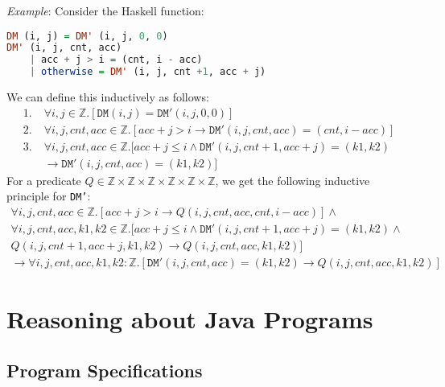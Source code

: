 \documentclass[10pt,twoside,twocolumn]{article}
\begin{document}
\emph{Example}: Consider the Haskell function:
\begin{lstlisting}[language=Haskell,basicstyle={\small\ttfamily},tabsize=4]
DM (i, j) = DM' (i, j, 0, 0)
DM' (i, j, cnt, acc)
	| acc + j > i = (cnt, i - acc)
	| otherwise = DM' (i, j, cnt +1, acc + j)
\end{lstlisting}
We can define this inductively as follows:
\begin{align*}
1.\; & \forall i,j\in\mathbb{Z}.\left[\mathtt{DM}\left(i,j\right)=\mathtt{DM'}\left(i,j,0,0\right)\right]\\
2.\; & \forall i,j,cnt,acc\in\mathbb{Z}.\left[acc+j>i\rightarrow\mathtt{DM'}\left(i,j,cnt,acc\right)=\left(cnt,i-acc\right)\right]\\
3.\; & \forall i,j,cnt,acc\in\mathbb{Z}.[acc+j\leq i\land\mathtt{DM'}\left(i,j,cnt+1,acc+j\right)=\left(k1,k2\right)\\
 & \rightarrow\mathtt{DM'}\left(i,j,cnt,acc\right)=\left(k1,k2\right)]
\end{align*}
For a predicate $Q\in\mathbb{Z}\times\mathbb{Z}\times\mathbb{Z}\times\mathbb{Z}\times\mathbb{Z}\times\mathbb{Z}$,
we get the following inductive principle for \texttt{DM'}:
\begin{multline*}
\forall i,j,cnt,acc\in\mathbb{Z}.\left[acc+j>i\rightarrow Q\left(i,j,cnt,acc,cnt,i-acc\right)\right]\land\\
\forall i,j,cnt,acc,k1,k2\in\mathbb{Z}.[acc+j\leq i\land\mathtt{DM'}\left(i,j,cnt+1,acc+j\right)=\left(k1,k2\right)\land\\
Q\left(i,j,cnt+1,acc+j,k1,k2\right)\rightarrow Q\left(i,j,cnt,acc,k1,k2\right)]\\
\rightarrow\forall i,j,cnt,acc,k1,k2:\mathbb{Z}.\left[\mathtt{DM'}\left(i,j,cnt,acc\right)=\left(k1,k2\right)\rightarrow Q\left(i,j,cnt,acc,k1,k2\right)\right]
\end{multline*}



\section{Reasoning about Java Programs}


\subsection{Program Specifications}
\end{document}
